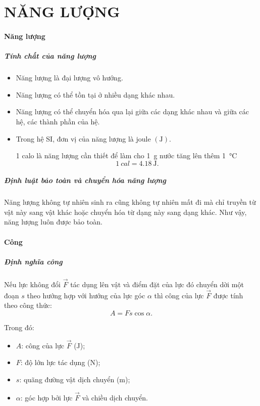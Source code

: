 \chapter{NĂNG LƯỢNG}
\begin{tomtat}
	\subsubsection{Năng lượng}
	\paragraph{Tính chất của năng lượng}
	\begin{itemize}
		\item Năng lượng là đại lượng vô hướng.
		\item Năng lượng có thể tồn tại ở nhiều dạng khác nhau.
		\item Năng lượng có thể chuyển hóa qua lại giữa các dạng khác nhau và giữa các hệ, các thành phần của hệ.
		\item Trong hệ SI, đơn vị của năng lượng là joule $\left(\si{\joule}\right)$.
		\begin{note}
			1 calo là năng lượng cần thiết để làm cho \SI{1}{\gram} nước tăng lên thêm \SI{1}{\celsius}
			$$\SI{1}{cal}=\SI{4.18}{\joule}.$$
		\end{note}
	\end{itemize}
	\paragraph{Định luật bảo toàn và chuyển hóa năng lượng}
	\begin{dl}
		Năng lượng không tự nhiên sinh ra cũng không tự nhiên mất đi mà chỉ truyền từ vật này sang vật khác hoặc chuyển hóa từ dạng này sang dạng khác. Như vậy, năng lượng luôn được bảo toàn.
	\end{dl}
	\subsubsection{Công}
	\paragraph{Định nghĩa công}
	\begin{dn}
		Nếu lực không đổi $\vec{F}$ tác dụng lên vật và điểm đặt của lực đó chuyển dời một đoạn $s$ theo hướng hợp với hướng của lực góc $\alpha$ thì công của lực $\vec{F}$ được tính theo công thức:
		$$A=Fs\cos\alpha.$$
	\end{dn}
	Trong đó:
	\begin{itemize}
		\item $A$: công của lực $\vec{F}$ (\si{\joule});
		\item $F$: độ lớn lực tác dụng (\si{\newton});
		\item $s$: quãng đường vật dịch chuyển (\si{\meter});
		\item $\alpha$: góc hợp bởi lực $\vec{F}$ và chiều dịch chuyển.
	\end{itemize}

\end{tomtat}
